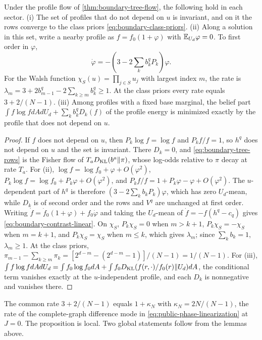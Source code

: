 Under the profile flow of \cref{thm:boundary-tree-flow}, the following hold in each sector.
(i) The set of profiles that do not depend on $u$ is invariant, and on it the rows converge to the class priors \cref{eq:boundary-class-priors}.
(ii) Along a solution in this set, write a nearby profile as $f=f_0(1+\varphi)$ with $\mathbb E_{U_d}\varphi=0$. To first order in $\varphi$,
\begin{equation}
 \dot\varphi=-\left(3-2\sum_kb_k^qP_k\right)\varphi.
 \label{eq:boundary-contrast-linear}
\end{equation}
For the Walsh function $\chi_S(u)=\prod_{j\in S}u_j$ with largest index $m$, the rate is $\lambda_m=3+2b_{m-1}^q-2\sum_{k\ge m}b_k^q\ge1$. At the class priors every rate equals $3+2/(N-1)$.
(iii) Among profiles with a fixed base marginal, the belief part $\int f\log f dA dU_d+\sum_kb_k^qD_k(f)$ of the profile energy is minimized exactly by the profile that does not depend on $u$.

\begin{proof}
If $f$ does not depend on $u$, then $P_k\log f=\log f$ and $P_kf/f=1$, so $h^q$ does not depend on $u$ and the set is invariant. There $D_k=0$, and \cref{eq:boundary-tree-rows} is the Fisher flow of $T_aD_{\mathrm{KL}}(b^a\Vert\pi)$, whose log-odds relative to $\pi$ decay at rate $T_a$. For (ii), $\log f=\log f_0+\varphi+O(\varphi^2)$, $P_k\log f=\log f_0+P_k\varphi+O(\varphi^2)$, and $P_kf/f=1+P_k\varphi-\varphi+O(\varphi^2)$. The $u$-dependent part of $h^q$ is therefore $(3-2\sum_kb_kP_k)\varphi$, which has zero $U_d$-mean, while $D_k$ is of second order and the rows and $V^q$ are unchanged at first order. Writing $\dot f=\dot f_0(1+\varphi)+f_0\dot\varphi$ and taking the $U_d$-mean of $\dot f=-f(h^q-c_q)$ gives \cref{eq:boundary-contrast-linear}. On $\chi_S$, $P_k\chi_S=0$ when $m>k+1$, $P_k\chi_S=-\chi_S$ when $m=k+1$, and $P_k\chi_S=\chi_S$ when $m\le k$, which gives $\lambda_m$; since $\sum_kb_k=1$, $\lambda_m\ge1$. At the class priors, $\pi_{m-1}-\sum_{k\ge m}\pi_k=[2^{d-m}-(2^{d-m}-1)]/(N-1)=1/(N-1)$. For (iii), $\int f\log f dA dU_d=\int f_0\log f_0dA+\int f_0D_{\mathrm{KL}}(f(r,\cdot)/f_0(r)\Vert U_d)dA$, the conditional term vanishes exactly at the $u$-independent profile, and each $D_k$ is nonnegative and vanishes there.
\end{proof}

The common rate $3+2/(N-1)$ equals $1+\kappa_N$ with $\kappa_N=2N/(N-1)$, the rate of the complete-graph difference mode in \cref{eq:public-phase-linearization} at $J=0$. The proposition is local. Two global statements follow from the lemmas above.

